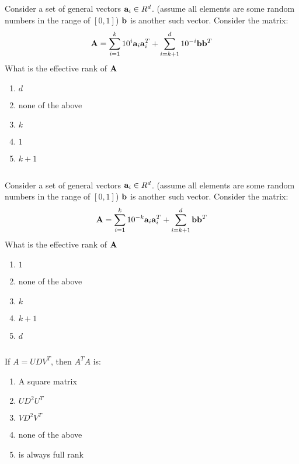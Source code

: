 \begin{frame}
\section{}
  Consider a set of general vectors ${\bf a}_i\in R^d$. (assume all elements are some random numbers in the range of $[0,1]$)
  ${\bf b}$ is another such vector. Consider the matrix:
  \[ {\bf A} = \sum_{i=1}^k 10^{i} {\bf a}_i {\bf a}_i^T + \sum_{i=k+1}^d 10^{-i}{\bf b}{\bf b}^T\]
  What is the effective rank of ${\bf A}$
 
\begin{enumerate}[label=(\Alph*)]
\item $d$
\item none of the above
\item $k$
\item $1$
\item $k+1$ 
\end{enumerate}
\end{frame}

\begin{frame}
\section{}
  Consider a set of general vectors ${\bf a}_i\in R^d$. (assume all elements are some random numbers in the range of $[0,1]$)
  ${\bf b}$ is another such vector. Consider the matrix:
  \[ {\bf A} = \sum_{i=1}^k 10^{-k} {\bf a}_i {\bf a}_i^T + \sum_{i=k+1}^d {\bf b}{\bf b}^T\]
  What is the effective rank of ${\bf A}$
 
\begin{enumerate}[label=(\Alph*)]
\item $1$
\item none of the above
\item $k$
\item $k+1$
\item $d$ 
\end{enumerate}
\end{frame}

\begin{frame}
\section{}
   If $A=UDV^T$, then $A^TA$ is:
 
\begin{enumerate}[label=(\Alph*)]
\item A square matrix
\item $UD^2U^T$
\item $VD^2V^T$
\item none of the above
\item is always full rank 
\end{enumerate}
\end{frame}

